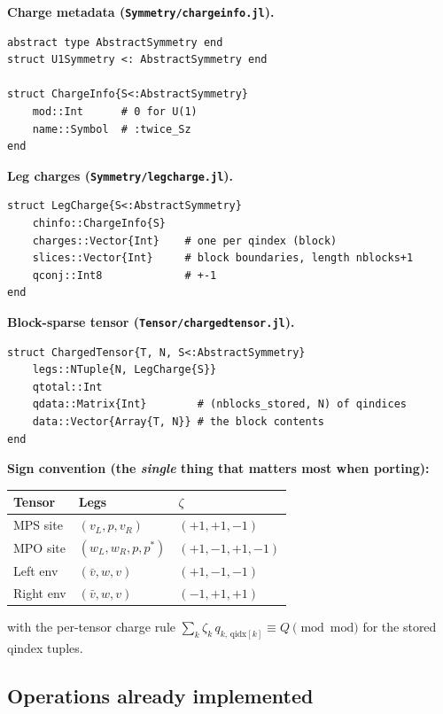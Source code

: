 \documentclass[11pt]{article}
\begin{document}
\textbf{Charge metadata (\texttt{Symmetry/chargeinfo.jl}).}
\begin{lstlisting}
abstract type AbstractSymmetry end
struct U1Symmetry <: AbstractSymmetry end

struct ChargeInfo{S<:AbstractSymmetry}
    mod::Int      # 0 for U(1)
    name::Symbol  # :twice_Sz
end
\end{lstlisting}

\textbf{Leg charges (\texttt{Symmetry/legcharge.jl}).}
\begin{lstlisting}
struct LegCharge{S<:AbstractSymmetry}
    chinfo::ChargeInfo{S}
    charges::Vector{Int}    # one per qindex (block)
    slices::Vector{Int}     # block boundaries, length nblocks+1
    qconj::Int8             # +-1
end
\end{lstlisting}

\textbf{Block-sparse tensor (\texttt{Tensor/chargedtensor.jl}).}
\begin{lstlisting}
struct ChargedTensor{T, N, S<:AbstractSymmetry}
    legs::NTuple{N, LegCharge{S}}
    qtotal::Int
    qdata::Matrix{Int}        # (nblocks_stored, N) of qindices
    data::Vector{Array{T, N}} # the block contents
end
\end{lstlisting}

\textbf{Sign convention (the \emph{single} thing that matters most when porting):}
\begin{center}
\begin{tabular}{lll}
\toprule
Tensor & Legs & $\zeta$ \\
\midrule
MPS site & $(v_L, p, v_R)$        & $(+1, +1, -1)$ \\
MPO site & $(w_L, w_R, p, p^*)$   & $(+1, -1, +1, -1)$ \\
Left env & $(\bar v, w, v)$       & $(+1, -1, -1)$ \\
Right env& $(\bar v, w, v)$       & $(-1, +1, +1)$ \\
\bottomrule
\end{tabular}
\end{center}
with the per-tensor charge rule
$\sum_k \zeta_k\,q_{k,\,\text{qidx}[k]} \equiv Q\pmod{\text{mod}}$ for the
stored qindex tuples.

\subsection{Operations already implemented}
\end{document}
